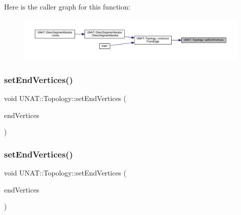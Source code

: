 Here is the caller graph for this function\+:
\nopagebreak
\begin{figure}[H]
\begin{center}
\leavevmode
\includegraphics[width=350pt]{classUNAT_1_1Topology_a238cee750b0467fe8d479b88f4cd2399_icgraph}
\end{center}
\end{figure}
\mbox{\label{classUNAT_1_1Topology_a238cee750b0467fe8d479b88f4cd2399}} 
\subsubsection{\texorpdfstring{setEndVertices()}{setEndVertices()}\hspace{0.1cm}{\footnotesize\ttfamily [2/3]}}
{\footnotesize\ttfamily void U\+N\+A\+T\+::\+Topology\+::set\+End\+Vertices (\begin{DoxyParamCaption}\item[{\mbox{\hyperlink{include_2swMacro_8h_a113cf5f6b5377cdf3fac6aa4e443e9aa}{sw\+Int}} $\ast$}]{end\+Vertices }\end{DoxyParamCaption})\hspace{0.3cm}{\ttfamily [inline]}}

\mbox{\label{classUNAT_1_1Topology_a238cee750b0467fe8d479b88f4cd2399}} 
\subsubsection{\texorpdfstring{setEndVertices()}{setEndVertices()}\hspace{0.1cm}{\footnotesize\ttfamily [3/3]}}
{\footnotesize\ttfamily void U\+N\+A\+T\+::\+Topology\+::set\+End\+Vertices (\begin{DoxyParamCaption}\item[{\mbox{\hyperlink{include_2swMacro_8h_a113cf5f6b5377cdf3fac6aa4e443e9aa}{sw\+Int}} $\ast$}]{end\+Vertices }\end{DoxyParamCaption})\hspace{0.3cm}{\ttfamily [inline]}}

